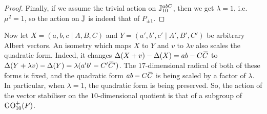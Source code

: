 \begin{proof}
    Finally, if we assume the trivial action on $\mathbb{J}_{10}^{abC}$, then we get $\lambda = 1$,
     i.e. 
    $\mu^2 = 1$, so the action on $\mathbb{J}$ is indeed that of $P_{\pm 1}$. 
\end{proof}

Now let $X = (a,b,c\mid A,B,C)$ and $Y = (a',b',c' \mid A', B', C')$ be arbitrary
Albert vectors. An isometry which maps $X$ to
    $Y$ and $v$ to $\lambda v$ also scales the
    quadratic form. Indeed, it changes 
    \mbox{$\Delta(X+v)-\Delta(X) = ab-C\mathord{\mbox{\hspace*{0pt}}\,\overline{\!C\!\!\;}\!\:}\mbox{\hspace*{0pt}}$} to
    \mbox{$\Delta(Y+\lambda v) - \Delta(Y) = \lambda (a'b' - C'\mathord{\mbox{\hspace*{0pt}}\,\overline{\!C\!\!\;}\!\:}\mbox{\hspace*{0pt}} ')$}. The \mbox{$17$-dimensional}
     radical
    of both of these forms is fixed, and the quadratic form $ab-C\mathord{\mbox{\hspace*{0pt}}\,\overline{\!C\!\!\;}\!\:}\mbox{\hspace*{0pt}}$ is being scaled by
    a factor of $\lambda$. In particular, when $\lambda = 1$, the quadratic
    form is being preserved. So, the action of the vector stabiliser on the $10$-dimensional
    quotient is that of a subgroup of $\mathrm{GO}_{10}^+(F)$. 

